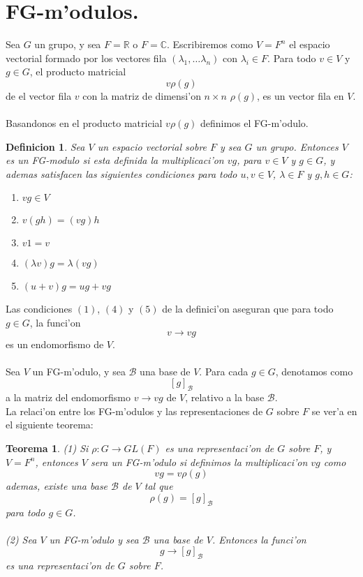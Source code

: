 \documentclass[a4paper,openright,12pt]{report}
\numberwithin{equation}{section} %
\newtheorem{teorema}{Teorema}[section] %
\newtheorem{definicion}{Definicion}[section] %
\begin{document}
\section{FG-m'odulos.}
Sea $G$ un grupo, y sea $F=\mathbb{R}$ o $F=\mathbb{C}$. Escribiremos como $V=F^{n}$ el espacio vectorial formado por los vectores fila $(\lambda_{1}, \ldots \lambda_{n})$ con $\lambda_{i} \in F$. Para todo $v \in V$ y $g \in G$, el producto matricial 
\[
v\rho (g)
\]
de el vector fila $v$ con la matriz de dimensi'on $n \times n$ $\rho (g)$, es un vector fila en $V$.\\
\\
Basandonos en el producto matricial $v\rho (g)$ definimos el FG-m'odulo.
\begin{definicion}
Sea $V$ un espacio vectorial sobre $F$ y sea $G$ un grupo. Entonces $V$ es un FG-modulo si esta definida la multiplicaci'on $vg$, para $v \in V$ y $g \in G$, y ademas satisfacen las siguientes condiciones para todo $u, v \in V$, $\lambda \in F$ y $g ,h \in G$:
\begin{enumerate}
\item $vg \in V$
\item $v(gh)=(vg)h$
\item $v1=v$
\item $(\lambda v)g=\lambda (vg)$
\item $(u+v)g=ug+vg$
\end{enumerate}
\end{definicion}
Las condiciones $(1)$, $(4)$ y $(5)$ de la definici'on aseguran que para todo $g \in G$, la funci'on
\[
v \rightarrow vg
\]
es un endomorfismo de $V$.\\
\\
Sea $V$ un FG-m'odulo, y sea $\mathscr{B}$ una base de $V$. Para cada $g \in G$, denotamos como 
\[
[g]_{\mathscr{B}}
\]
a la matriz del endomorfismo $v \rightarrow vg$ de $V$, relativo a la base $\mathscr{B}$.\\
La relaci'on entre los FG-m'odulos y las representaciones de $G$ sobre $F$ se ver'a en el siguiente teorema:
\begin{teorema}
(1) Si $\rho : G \rightarrow GL(F)$ es una representaci'on de $G$ sobre $F$, y $V=F^{n}$, entonces $V$ sera un FG-m'odulo si definimos la multiplicaci'on $vg$ como
\[
vg=v \rho (g)
\]
ademas, existe una base $\mathscr{B}$ de $V$ tal que
\[
\rho (g) = [g]_{\mathscr{B}}
\]
para todo $g \in G$.\\
\\
(2) Sea $V$ un FG-m'odulo y sea $\mathscr{B}$ una base de $V$. Entonces la funci'on 
\[
g \rightarrow [g]_{\mathscr{B}}
\]
es una representaci'on de $G$ sobre $F$. 
\end{teorema}
\end{document}
